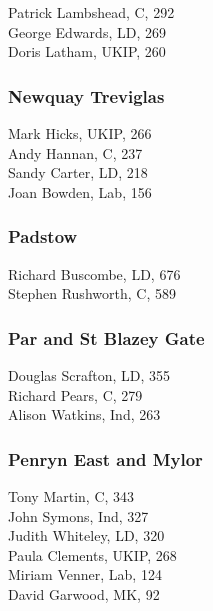 \documentclass[a4paper,openany,10pt]{book}
\begin{document}


Patrick Lambshead, C, 292\\
George Edwards, LD, 269\\
Doris Latham, UKIP, 260\\


\subsubsection*{Newquay Treviglas}



Mark Hicks, UKIP, 266\\
Andy Hannan, C, 237\\
Sandy Carter, LD, 218\\
Joan Bowden, Lab, 156\\


\subsubsection*{Padstow}



Richard Buscombe, LD, 676\\
Stephen Rushworth, C, 589\\


\subsubsection*{Par and St Blazey Gate}



Douglas Scrafton, LD, 355\\
Richard Pears, C, 279\\
Alison Watkins, Ind, 263\\


\subsubsection*{Penryn East and Mylor}



Tony Martin, C, 343\\
John Symons, Ind, 327\\
Judith Whiteley, LD, 320\\
Paula Clements, UKIP, 268\\
Miriam Venner, Lab, 124\\
David Garwood, MK, 92\\
\end{document}
